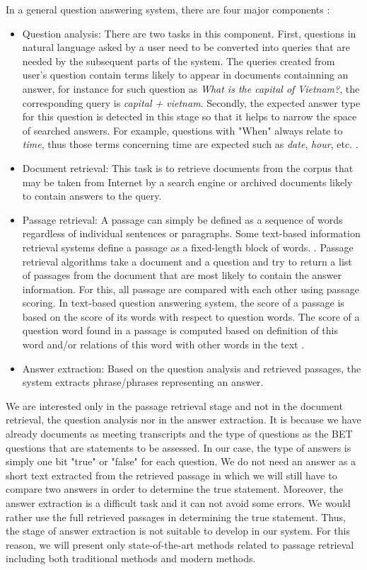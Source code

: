 In a general question answering system, there are four major components \cite{tellex2003pmf, hirschman2002nlq,tellex2003qep, bilotti2004wbq}:

\begin{itemize}
\item {Question analysis: There are two tasks in this component. First, questions in natural language asked by a user need to be converted into queries that are needed by the subsequent parts of the system. The queries created from user's question contain terms likely to appear in documents containning an answer, for instance for such question as \textit{What is the capital of Vietnam?}, the corresponding query is \textit{capital + vietnam}. Secondly, the expected answer type for this question is detected in this stage so that it helps to narrow the space of searched answers. For example, questions with "When" always relate to \textit{time}, thus those terms concerning time are expected such as \textit{date}, \textit{hour}, etc. }.
\item {Document retrieval: This task is to retrieve documents from the corpus that may be taken from Internet by a search engine or archived documents likely to contain answers to the query.}
\item {Passage retrieval: A passage can simply be defined as a sequence of words regardless of individual sentences or paragraphs. Some text-based information retrieval systems define a passage as a fixed-length block of words. \cite{goharian2008dsp}. Passage retrieval algorithms take a document and a question and try to return a list of passages from the document that are most likely to contain the answer information. For this,  all passage are compared with each other using passage scoring. In text-based question answering system, the score of a passage is based on the score of its words with respect to question words. The score of a question word found in a passage is computed based on definition of this word and/or relations of this word with other words in the text \cite{tellex2003qep}.}
\item {Answer extraction: Based on the question analysis and retrieved passages, the system extracts phrase/phrases representing an answer.}
\end{itemize}

We are interested only in the passage retrieval stage and not in the document retrieval, the question analysis nor in the answer extraction. It is because we have already documents as meeting transcripts and the type of questions as the BET questions that are statements to be assessed. In our case, the type of answers is simply one bit "true" or "false" for each question. We do not need an answer as a short text extracted from the retrieved passage in which we will still have to compare two answers in order to determine the true statement. Moreover, the answer extraction is a difficult task and it can not avoid some errors. We would rather use the full retrieved passages in determining the true statement. Thus, the stage of answer extraction is not suitable to develop in our system. For this reason, we will present only state-of-the-art methods related to passage retrieval including both traditional methods and modern methods.


